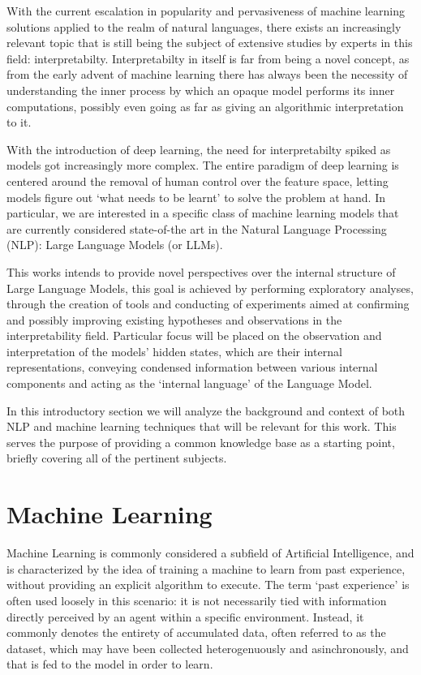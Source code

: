 With the current escalation in popularity and pervasiveness of machine learning solutions applied to the realm of natural languages, there exists an increasingly relevant topic that is still being the subject of extensive studies by experts in this field: interpretabilty.
Interpretabilty in itself is far from being a novel concept, as from the early advent of machine learning there has always been the necessity of understanding the inner process by which an opaque model performs its inner computations, possibly even going as far as giving an algorithmic interpretation to it. 

With the introduction of deep learning, the need for interpretabilty spiked as models got increasingly more complex.
The entire paradigm of deep learning is centered around the removal of human control over the feature space, letting models figure out `what needs to be learnt' to solve the problem at hand.
In particular, we are interested in a specific class of machine learning models that are currently considered state-of-the art in the Natural Language Processing (NLP): Large Language Models (or LLMs).

This works intends to provide novel perspectives over the internal structure of Large Language Models, this goal is achieved by performing exploratory analyses, through the creation of tools and conducting of experiments aimed at confirming and possibly improving existing hypotheses and observations in the interpretability field.
Particular focus will be placed on the observation and interpretation of the models' hidden states, which are their internal representations, conveying condensed information between various internal components and acting as the `internal language' of the Language Model.

In this introductory section we will analyze the background and context of both NLP and machine learning techniques that will be relevant for this work.
This serves the purpose of providing a common knowledge base as a starting point, briefly covering all of the pertinent subjects.

\section{Machine Learning}

Machine Learning is commonly considered a subfield of Artificial Intelligence, and is characterized by the idea of training a machine to learn from past experience, without providing an explicit algorithm to execute.
The term `past experience' is often used loosely in this scenario: it is not necessarily tied with information directly perceived by an agent within a specific environment.
Instead, it commonly denotes the entirety of accumulated data, often referred to as the dataset, which may have been collected heterogenuously and asinchronously, and that is fed to the model in order to learn.


